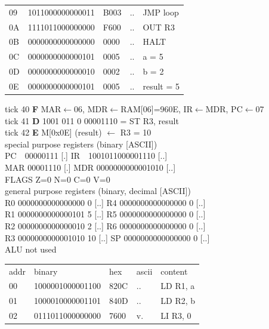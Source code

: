 \begin{tcolorbox}[stepbox, title={Instruction 13 \hfill ticks 37 to 39 \quad ADD R3, R3, R1}]
{\begin{tabular}{@{}lllll@{}}
09 & 1011000000000011 & B003 & .. & JMP loop\\
0A & 1111011000000000 & F600 & .. & OUT R3\\
0B & 0000000000000000 & 0000 & .. & HALT\\
\rowcolor{datac}0C & 0000000000000101 & 0005 & .. & a = 5\\
\rowcolor{datac}0D & 0000000000000010 & 0002 & .. & b = 2\\
\rowcolor{datac}0E & 0000000000000101 & 0005 & .. & result = 5\\
\end{tabular}}
\end{tcolorbox}\hfill\begin{tcolorbox}[stepbox, title={Instruction 14 \hfill ticks 40 to 42 \quad ST R3, result}]
\textcolor{dim}{tick 40} \textbf{F} MAR$\leftarrow$06, MDR$\leftarrow$RAM[06]=960E, IR$\leftarrow$MDR, PC$\leftarrow$07\\
\textcolor{dim}{tick 41} \textbf{D} 1001 011 0 00001110 = ST R3, result\\
\textcolor{dim}{tick 42} \textbf{E} M[0x0E] (result) $\leftarrow$ R3 = 10\\[2pt]
\textcolor{dim}{special purpose registers (binary [ASCII])}\\
PC~~00000111 [.] \hfill IR~~1001011000001110 [..]\\
MAR 00001110 [.] \hfill MDR 0000000000001010 [..]\\
FLAGS Z=0 N=0 C=0 V=0\\[2pt]
\textcolor{dim}{general purpose registers (binary, decimal [ASCII])}\\
R0 0000000000000000 0 [..] \hfill R4 0000000000000000 0 [..]\\
R1 0000000000000101 5 [..] \hfill R5 0000000000000000 0 [..]\\
R2 0000000000000010 2 [..] \hfill R6 0000000000000000 0 [..]\\
R3 0000000000001010 10 [..] \hfill SP 0000000000000000 0 [..]\\
\textcolor{dim}{ALU not used}\\[2pt]
{\setlength{\tabcolsep}{2pt}\begin{tabular}{@{}lllll@{}}
\textcolor{dim}{addr} & \textcolor{dim}{binary} & \textcolor{dim}{hex} & \textcolor{dim}{ascii} & \textcolor{dim}{content}\\
00 & 1000001000001100 & 820C & .. & LD R1, a\\
01 & 1000010000001101 & 840D & .. & LD R2, b\\
02 & 0111011000000000 & 7600 & v. & LI R3, 0\\

\end{tabular}}
\end{tcolorbox}
